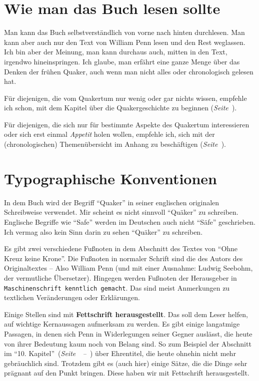 \chapter{Wie man das Buch lesen sollte}

Man kann das Buch selbstverständlich von vorne nach hinten durchlesen. Man kann aber auch nur den Text
von William Penn lesen und den Rest weglassen. Ich bin aber der Meinung, man kann
durchaus auch, mitten in den Text, irgendwo hineinspringen. Ich glaube, man
erfährt eine ganze Menge über das Denken der frühen Quaker, auch wenn man nicht
alles oder chronologisch gelesen hat.

\medskip

Für diejenigen, die vom Quakertum nur wenig oder gar nichts wissen, empfehle ich
 schon, mit dem Kapitel über die Quakergeschichte zu beginnen
 (\textit{Seite~\pageref{ref:entwicklung_quakertum}}).

\medskip

Für diejenigen, die sich nur für bestimmte Aspekte des Quakertum interessieren oder
sich erst einmal \textit{Appetit} holen wollen, empfehle ich, sich mit der
(chronologischen) Themenübersicht im Anhang zu beschäftigen
(\textit{Seite~\pageref{ref:theme_nuebersicht}}).

\chapter{Typographische Konventionen}

In dem Buch wird der Begriff "`Quaker"'  in seiner
englischen originalen Schreibweise verwendet. Mir scheint es nicht sinnvoll
"`Quäker"' zu schreiben. Englische Begriffe wie "`Safe"' werden im Deutschen
auch nicht "`Säfe"' geschrieben. Ich vermag also kein Sinn darin zu sehen
"`Quäker"' zu schreiben.

\medskip

Es gibt zwei verschiedene Fußnoten in dem Abschnitt des Textes von "`Ohne Kreuz
keine Krone"'. Die Fußnoten in normaler Schrift sind die des Autors des
Originaltextes -- Also William Penn (und mit einer Ausnahme: Ludwig Seebohm, der vermutliche Übersetzer). 
Hingegen werden Fußnoten der Herausgeber in
\texttt{Maschinenschrift kenntlich gemacht}. Das sind meist Anmerkungen zu
textlichen Veränderungen oder Erklärungen.

\medskip

Einige Stellen sind mit \textbf{Fettschrift herausgestellt}. Das soll dem Leser
helfen, auf wichtige Kernaussagen aufmerksam zu werden. Es gibt einige langatmige
Passagen, in denen sich Penn in Widerlegungen seiner Gegner auslässt, die
heute von ihrer Bedeutung kaum noch von Belang sind. So zum Beispiel der Abschnitt im
"`10. Kapitel"'~(\textit{Seite~\pageref{kap10}~--~\pageref{kap10_ende}}) über
Ehrentitel, die heute ohnehin nicht mehr gebräuchlich sind. Trotzdem gibt es
(auch hier) einige Sätze, die die Dinge sehr prägnant auf den Punkt bringen.
Diese haben wir mit Fettschrift herausgestellt.

